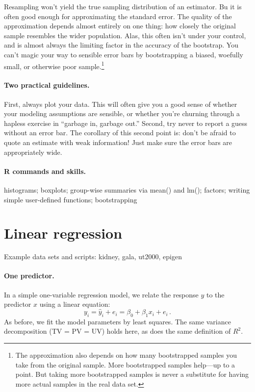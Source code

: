 \documentclass[11pt]{article}
\newcommand{\1}[1]{\mathbf{1}_{\{ {#1} \}}}
\begin{document}
Resampling won't yield the true sampling distribution of an estimator.  Bu it is often good enough for approximating the standard error.  The quality of the approximation depends almost entirely on one thing: how closely the original sample resembles the wider population.   Alas, this often isn't under your control, and is almost always the limiting factor in the accuracy of the bootstrap.  You can't magic your way to sensible error bars by bootstrapping a biased, woefully small, or otherwise poor sample.\footnote{The approximation also depends on how many bootstrapped samples you take from the original sample.  More bootstrapped samples help---up to a point.  But taking more bootstrapped samples is never a substitute for having more actual samples in the real data set.}


\paragraph{Two practical guidelines.}  First, always plot your data.  This will often give you a good sense of whether your modeling assumptions are sensible, or whether you're churning through a hapless exercise in ``garbage in, garbage out.''  Second, try never to report a guess without an error bar.  The corollary of this second point is: don't be afraid to quote an estimate with weak information!  Just make sure the error bars are appropriately wide.


\paragraph{R commands and skills.} histograms; boxplots; group-wise summaries via mean() and lm(); factors; writing simple user-defined functions; bootstrapping


\section{Linear regression}
Example data sets and scripts: kidney, gala, ut2000, epigen

\paragraph{One predictor.}

In a simple one-variable regression model, we relate the response $y$ to the predictor $x$ using a linear equation:
$$
y_i = \hat{y}_i + e_i = \beta_0 + \beta_1 x_i + e_i \, .
$$
As before, we fit the model parameters by least squares.  The same variance decomposition (TV = PV = UV) holds here, as does the same definition of $R^2$.
\end{document}
